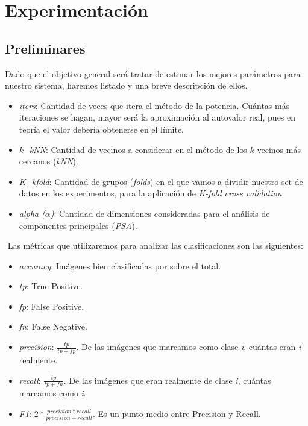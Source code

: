 \section{Experimentación}

\subsection{Preliminares}

Dado que el objetivo general será tratar de estimar los mejores parámetros para nuestro sistema, haremos listado y una breve descripción de ellos.

\begin{itemize}
\item \textit{iters}: Cantidad de veces que itera el método de la potencia. Cuántas más iteraciones se hagan, mayor será la aproximación al autovalor real, pues en teoría el valor debería obtenerse en el límite.

\item \textit{k\_kNN}: Cantidad de vecinos a considerar en el método de los $k$ vecinos más cercanos (\textit{kNN}).

\item \textit{K\_kfold}: Cantidad de grupos (\textit{folds}) en el que vamos a dividir nuestro set de datos en los experimentos, para la aplicación de \textit{K-fold cross validation}

\item \textit{alpha ($\alpha$)}: Cantidad de dimensiones consideradas para el análisis de componentes principales (\textit{PSA}).

\end{itemize}
$ $\newline
Las métricas que utilizaremos para analizar las clasificaciones son las siguientes:

\begin{itemize}

    \item \textit{accuracy}: Imágenes bien clasificadas por sobre el total.

    \item \textit{tp}: True Positive.

    \item \textit{fp}: False Positive.

    \item \textit{fn}: False Negative.

    \item \textit{precision}: $\frac{tp}{tp + fp}$. De las imágenes que marcamos como clase \textit{i}, cuántas eran \textit{i} realmente.

    \item \textit{recall}:  $\frac{tp}{tp + fn}$. De las imágenes que eran realmente de clase \textit{i}, cuántas marcamos como \textit{i}.

    \item \textit{F1}: $2 * \frac{precision * recall}{precision + recall}$. Es un punto medio entre Precision y Recall.

\end{itemize}



